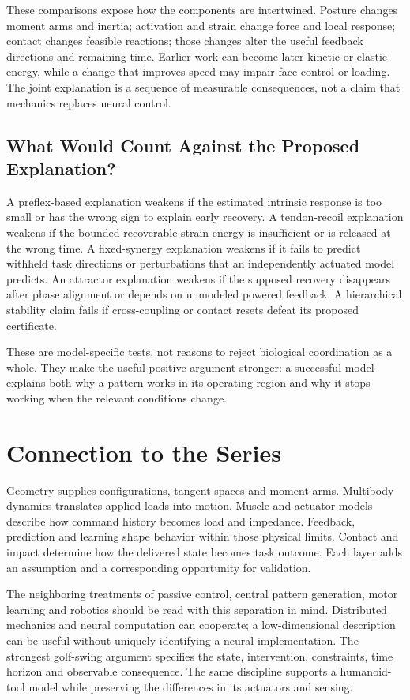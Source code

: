 These comparisons expose how the components are intertwined. Posture changes
moment arms and inertia; activation and strain change force and local response;
contact changes feasible reactions; those changes alter the useful feedback
directions and remaining time. Earlier work can become later kinetic or elastic
energy, while a change that improves speed may impair face control or loading.
The joint explanation is a sequence of measurable consequences, not a claim
that mechanics replaces neural control.

\subsection{What Would Count Against the Proposed Explanation?}

A preflex-based explanation weakens if the estimated intrinsic response is
too small or has the wrong sign to explain early recovery. A tendon-recoil
explanation weakens if the bounded recoverable strain energy is insufficient
or is released at the wrong time. A fixed-synergy explanation weakens if it
fails to predict withheld task directions or perturbations that an independently
actuated model predicts. An attractor explanation weakens if the supposed
recovery disappears after phase alignment or depends on unmodeled powered
feedback. A hierarchical stability claim fails if cross-coupling or contact
resets defeat its proposed certificate.

These are model-specific tests, not reasons to reject biological coordination
as a whole. They make the useful positive argument stronger: a successful
model explains both why a pattern works in its operating region and why it
stops working when the relevant conditions change.

\section{Connection to the Series}

Geometry supplies configurations, tangent spaces and moment arms. Multibody
dynamics translates applied loads into motion. Muscle and actuator models
describe how command history becomes load and impedance. Feedback, prediction
and learning shape behavior within those physical limits. Contact and impact
determine how the delivered state becomes task outcome. Each layer adds an
assumption and a corresponding opportunity for validation.

The neighboring treatments of passive control, central pattern generation,
motor learning and robotics should be read with this separation in mind.
Distributed mechanics and neural computation can cooperate; a low-dimensional
description can be useful without uniquely identifying a neural implementation.
The strongest golf-swing argument specifies the state, intervention, constraints,
time horizon and observable consequence. The same discipline supports a
humanoid-tool model while preserving the differences in its actuators and sensing.

